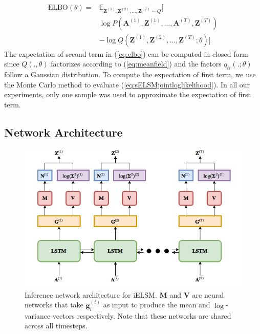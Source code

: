 \documentclass[letterpaper]{article}
\begin{document}
\begin{equation}
    \label{eq:elbo}
    \begin{split}
        \mathrm{ELBO}(\theta) = &\mathbb{E}_{\mathbf{Z}^{(1)}, \mathbf{Z}^{(2)}, ..., \mathbf{Z}^{(T)} \sim Q}[ \\
        &\log P(\mathbf{A}^{(1)}, \mathbf{Z}^{(1)}, ..., \mathbf{A}^{(T)}, \mathbf{Z}^{(T)}) \\
        &- \log Q(\mathbf{Z}^{(1)}, \mathbf{Z}^{(2)}, ..., \mathbf{Z}^{(T)}; \theta)]
    \end{split}
\end{equation}
The expectation of second term in (\ref{eq:elbo}) can be computed in closed form since $Q(., \theta)$ factorizes according to (\ref{eq:meanfield}) and the factors $q_{ti}(.; \theta)$ follow a Gaussian distribution. To compute the expectation of first term, we use the Monte Carlo method to evaluate (\ref{eq:sELSMjointloglikelihood}). In all our experiments, only one sample was used to approximate the expectation of first term.


\subsection{Network Architecture}
\label{section:networkarchitecture}

\begin{figure}
\begin{center}
\centering
\includegraphics[scale=0.35]{network_architecture}
\caption{Inference network architecture for iELSM. $\mathbf{M}$ and $\mathbf{V}$ are neural networks that take $\mathbf{g}_i^{(t)}$ as input to produce the mean and $\log$-variance vectors respectively. Note that these networks are shared across all timesteps.}
\label{fig:networkmodel}
\end{center}
\end{figure}
\end{document}

